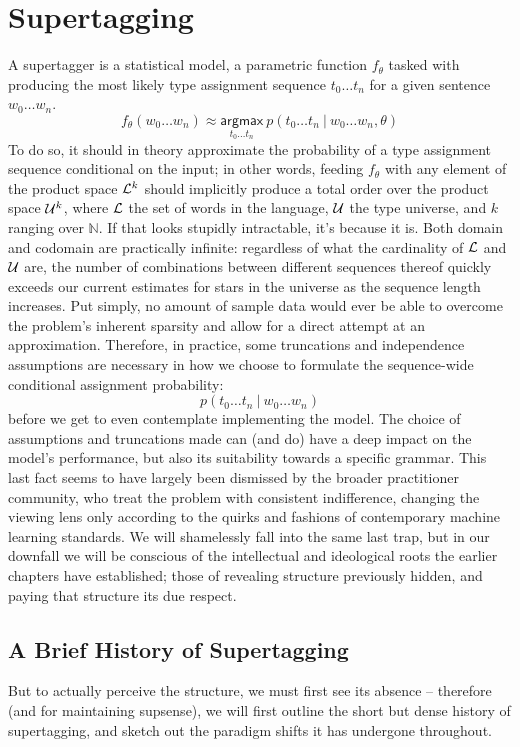 \section{Supertagging}
A supertagger is a statistical model, a parametric function $f_\theta$ tasked with producing the most likely type assignment sequence $t_0 \dots t_n$ for a given sentence $w_0 \dots w_n$.
\begin{equation}
	f_\theta(w_0 \dots w_n) \approx \underset{t_0\dots t_n}{\mathsf{argmax}} ~ p(t_0\dots t_n \ | \ w_0 \dots w_n, \theta)
\end{equation}
To do so, it should in theory approximate the probability of a type assignment sequence conditional on the input; in other words, feeding $f_\theta$ with any element of the product space $\mathcal{L}^k$ should implicitly produce a total order over the product space $\mathcal{U}^{k}$, where $\mathcal{L}$ the set of words in the language, $\mathcal{U}$ the type universe, and $k$ ranging over $\mathbb{N}$.
If that looks stupidly intractable, it's because it is.
Both domain and codomain are practically infinite: regardless of what the cardinality of $\mathcal{L}$ and $\mathcal{U}$ are, the number of combinations between different sequences thereof quickly exceeds our current estimates for stars in the universe as the sequence length increases.
Put simply, no amount of sample data would ever be able to overcome the problem's inherent sparsity and allow for a direct attempt at an approximation.
Therefore, in practice, some truncations and independence assumptions are necessary in how we choose to formulate the sequence-wide conditional assignment probability:
\begin{equation}\label{equation:supertag}
p(t_0\dots t_n \ | \ w_0 \dots w_n)
\end{equation}
before we get to even contemplate implementing the model.
The choice of assumptions and truncations made can (and do) have a deep impact on the model's performance, but also its suitability towards a specific grammar.
This last fact seems to have largely been dismissed by the broader practitioner community, who treat the problem with consistent indifference, changing the viewing lens only according to the quirks and fashions of contemporary machine learning standards.
We will shamelessly fall into the same last trap, but in our downfall we will be conscious of the intellectual and ideological roots the earlier chapters have established; those of revealing structure previously hidden, and paying that structure its due respect.

\subsection{A Brief History of Supertagging}
But to actually perceive the structure, we must first see its absence -- therefore (and for maintaining supsense), we will first outline the short but dense history of supertagging, and sketch out the paradigm shifts it has undergone throughout.

